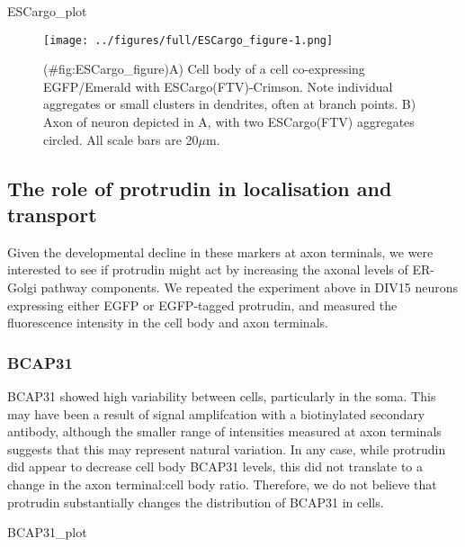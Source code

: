 \documentclass[
  12pt,
  a4paper,
]{book}
\newenvironment{Shaded}{\begin{snugshade}}{\end{snugshade}}
\newcommand{\NormalTok}[1]{#1}
\begin{document}
\begin{Shaded}
\begin{Highlighting}[]
\NormalTok{ESCargo\_plot}
\end{Highlighting}
\end{Shaded}

\begin{figure}
\centering
\texttt{[image: ../figures/full/ESCargo\_figure-1.png]}
\caption{(\#fig:ESCargo\_figure)A) Cell body of a cell co-expressing EGFP/Emerald with ESCargo(FTV)-Crimson. Note individual aggregates or small clusters in dendrites, often at branch points. B) Axon of neuron depicted in A, with two ESCargo(FTV) aggregates circled. All scale bars are 20\(\mu\)m.}
\end{figure}

\hypertarget{the-role-of-protrudin-in-localisation-and-transport}{%
\subsection{The role of protrudin in localisation and transport}\label{the-role-of-protrudin-in-localisation-and-transport}}

Given the developmental decline in these markers at axon terminals, we were interested to see if protrudin might act by increasing the axonal levels of ER-Golgi pathway components. We repeated the experiment above in DIV15 neurons expressing either EGFP or EGFP-tagged protrudin, and measured the fluorescence intensity in the cell body and axon terminals.

\hypertarget{bcap31}{%
\subsubsection{BCAP31}\label{bcap31}}

BCAP31 showed high variability between cells, particularly in the soma. This may have been a result of signal amplifcation with a biotinylated secondary antibody, although the smaller range of intensities measured at axon terminals suggests that this may represent natural variation. In any case, while protrudin did appear to decrease cell body BCAP31 levels, this did not translate to a change in the axon terminal:cell body ratio. Therefore, we do not believe that protrudin substantially changes the distribution of BCAP31 in cells.

\begin{Shaded}
\begin{Highlighting}[]
\NormalTok{BCAP31\_plot}
\end{Highlighting}
\end{Shaded}
\end{document}
